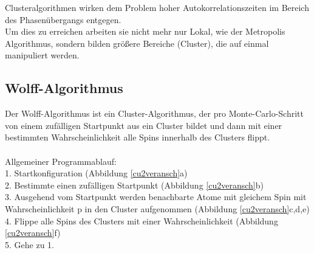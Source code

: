 Clusteralgorithmen wirken dem Problem hoher Autokorrelationszeiten im Bereich des Phasenübergangs entgegen.\\
Um dies zu erreichen arbeiten sie nicht mehr nur Lokal, wie der Metropolis Algorithmus, sondern bilden größere Bereiche (Cluster), die auf einmal manipuliert werden.

\subsection{Wolff-Algorithmus}
Der Wolff-Algorithmus ist ein Cluster-Algorithmus, der pro Monte-Carlo-Schritt von einem zufälligen Startpunkt aus ein Cluster bildet und dann mit einer bestimmten Wahrscheinlichkeit alle Spins innerhalb des Clusters flippt.\\\\
Allgemeiner Programmablauf:\\
1. Startkonfiguration (Abbildung \ref{cu2veransch}a)\\
2. Bestimmte einen zufälligen Startpunkt (Abbildung \ref{cu2veransch}b)\\
3. Ausgehend vom Startpunkt werden benachbarte Atome mit gleichem Spin mit Wahrscheinlichkeit p in den Cluster aufgenommen (Abbildung \ref{cu2veransch}c,d,e)\\
4. Flippe alle Spins des Clusters mit einer Wahrscheinlichkeit (Abbildung \ref{cu2veransch}f)\\
5. Gehe zu 1.\\
